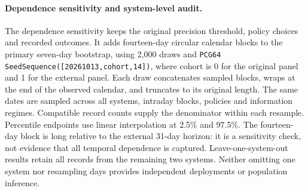 \paragraph{Dependence sensitivity and system-level audit.}
The dependence sensitivity keeps the original precision threshold, policy
choices and recorded outcomes. It adds fourteen-day circular calendar blocks
to the primary seven-day bootstrap, using 2,000 draws and
\texttt{PCG64 SeedSequence([20261013,cohort,14])}, where cohort is 0 for the
original panel and 1 for the external panel. Each draw concatenates sampled
blocks, wraps at the end of the observed calendar, and truncates to its
original length. The same dates are sampled across all systems, intraday
blocks, policies and information regimes. Compatible record counts supply
the denominator within each resample. Percentile endpoints use linear
interpolation at 2.5\% and 97.5\%. The fourteen-day block is long relative
to the external 31-day horizon: it is a sensitivity check, not evidence that
all temporal dependence is captured. Leave-one-system-out results retain all
records from the remaining two systems. Neither omitting one system nor
resampling days provides independent deployments or population inference.

